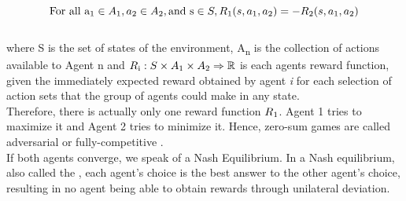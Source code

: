 \[ 
\text{For all a\textsubscript{1}} \in A\textsubscript{1}, a \textsubscript{2} \in A\textsubscript{2}, \text{and s} \in S, R\textsubscript{1}(s, a\textsubscript{1}, a \textsubscript{2}) = - R\textsubscript{2}(s, a\textsubscript{1}, a \textsubscript{2})
\]
\\
where S is the set of states of the environment, A\textsubscript{n} is the collection of actions available to Agent n and $R\textsubscript{i}:S\times A\textsubscript{1}\times A\textsubscript{2} \Rightarrow \mathbb{R}$ is each agents reward function,  given the immediately expected reward obtained by agent \textit{i} for each selection of action sets that the group of agents could make in any state\cite{basics1littman1994markov}.\\
Therefore, there is actually only one reward function $R\textsubscript{1}$. Agent 1 tries to maximize it and Agent 2 tries to minimize it. Hence, zero-sum games are called adversarial or fully-competitive \cite{basics1littman1994markov}.\\
If both agents converge, we speak of a Nash Equilibrium.
In a Nash equilibrium, also called the , each agent's choice is the best answer to the other agent's choice, resulting in no agent being able to obtain rewards through unilateral deviation\cite{nashgharesifard2013distributed, basics2hu1998multiagent}.


